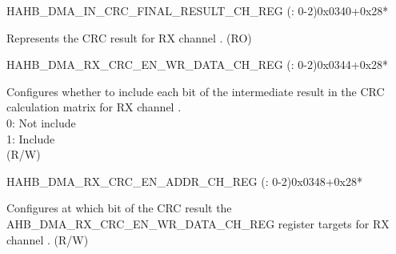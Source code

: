 \begin{register}{H}{AHB\_DMA\_IN\_CRC\_FINAL\_RESULT\_CH\_REG (: 0-2)}{0x0340+0x28*}\label{regdesc:AHBDMAINCRCFINALRESULTCHNREG}
%
\regnewline%
\begin{regdesc}\begin{reglist}
\label{fielddesc:AHBDMAINCRCFINALRESULTCHN}\item [AHB\_DMA\_IN\_CRC\_FINAL\_RESULT\_CH\regindex{n}] Represents the CRC result for RX channel . (RO)
\end{reglist}\end{regdesc}
\end{register}


\begin{register}{H}{AHB\_DMA\_RX\_CRC\_EN\_WR\_DATA\_CH\_REG (: 0-2)}{0x0344+0x28*}\label{regdesc:AHBDMARXCRCENWRDATACHNREG}
%
\regnewline%
\begin{regdesc}\begin{reglist}
\label{fielddesc:AHBDMARXCRCENWRDATACHN}\item [AHB\_DMA\_RX\_CRC\_EN\_WR\_DATA\_CH\regindex{n}] Configures whether to include each bit of the intermediate result in the CRC calculation matrix for RX channel .\\
0: Not include\\
1: Include\\ (R/W)
\end{reglist}\end{regdesc}
\end{register}


\begin{register}{H}{AHB\_DMA\_RX\_CRC\_EN\_ADDR\_CH\_REG (: 0-2)}{0x0348+0x28*}\label{regdesc:AHBDMARXCRCENADDRCHNREG}
%
\regnewline%
\begin{regdesc}\begin{reglist}
\label{fielddesc:AHBDMARXCRCENADDRCHN}\item [AHB\_DMA\_RX\_CRC\_EN\_ADDR\_CH\regindex{n}] Configures at which bit of the CRC result the AHB\_DMA\_RX\_CRC\_EN\_WR\_DATA\_CH\_REG register targets for RX channel . (R/W)
\end{reglist}\end{regdesc}
\end{register}


